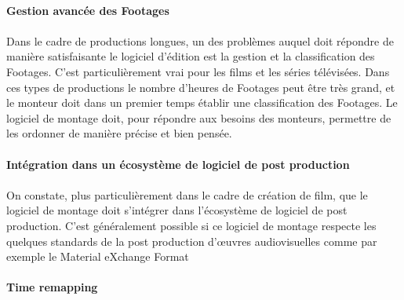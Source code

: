 \paragraph{Gestion avancée des Footages}

\paragraph{}

Dans le cadre de productions longues, un des problèmes auquel doit
répondre de manière satisfaisante le logiciel d'édition est la gestion
et la classification des Footages. C'est particulièrement vrai pour
les films et les séries télévisées. Dans ces types de productions
le nombre d'heures de Footages peut être très grand, et le monteur
doit dans un premier temps établir une classification des Footages. Le
logiciel de montage doit, pour répondre aux besoins des monteurs,
permettre de les ordonner de manière précise et bien pensée.

\paragraph{Intégration dans un écosystème de logiciel de post
production}

\paragraph{}

On constate, plus particulièrement dans le cadre de création de film, que le
logiciel de montage doit s'intégrer dans l'écosystème de logiciel
de post production. C'est généralement possible si ce logiciel
de montage respecte les quelques standards de la post production
d'œuvres audiovisuelles comme par exemple le Material eXchange Format
 

\paragraph{Time remapping}

\paragraph{}

